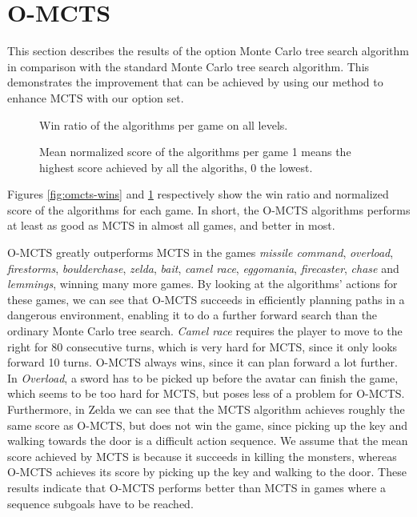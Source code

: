 \section{O-MCTS}
This section describes the results of the option Monte Carlo tree search
algorithm in comparison with the standard Monte Carlo tree search algorithm.
This demonstrates the improvement that can be achieved by using our method to
enhance MCTS with our option set.

\label{subsec:omcts}
\begin{figure}
	\centering
	\vspace{-.8cm}
	\caption{Win ratio of the algorithms per game on all levels.}
	\label{fig:omcts-wins}
	\centering
	\vspace{-.8cm}
	\caption{Mean normalized score of the algorithms per game 1 means the
	highest score achieved by all the algoriths, 0 the lowest.}
	\label{fig:omcts-scores}
\end{figure}

Figures \ref{fig:omcts-wins} and \ref{fig:omcts-scores} respectively show the
win ratio and normalized score of the algorithms for each game. In short, the
O-MCTS algorithms performs at least as good as MCTS in almost all games, and
better in most.

O-MCTS greatly outperforms MCTS in the games \textit{missile
command}, \textit{overload}, \textit{firestorms}, \textit{boulderchase},
\textit{zelda}, \textit{bait}, \textit{camel race}, \textit{eggomania},
\textit{firecaster}, \textit{chase} and \textit{lemmings}, winning many more
games. By looking at the algorithms' actions for these games, we can see
that O-MCTS succeeds in efficiently planning paths in a dangerous environment,
enabling it to do a further forward search than the ordinary Monte Carlo tree
search. \textit{Camel race} requires the player to move to the right for 80
consecutive turns, which is very hard for MCTS, since it only looks forward 10
turns. O-MCTS always wins, since it can plan forward a lot further. In
\textit{Overload}, a sword has to be picked up before the avatar can finish the
game, which seems to be too hard for MCTS, but poses less of a problem for
O-MCTS.  Furthermore, in Zelda we can see that the MCTS algorithm achieves
roughly the same score as O-MCTS, but does not win the game, since picking up
the key and walking towards the door is a difficult action sequence.  We assume
that the mean score achieved by MCTS is because it succeeds in killing the
monsters, whereas O-MCTS achieves its score by picking up the key and walking to
the door.  These results indicate that O-MCTS performs better than MCTS in games
where a sequence subgoals have to be reached.

